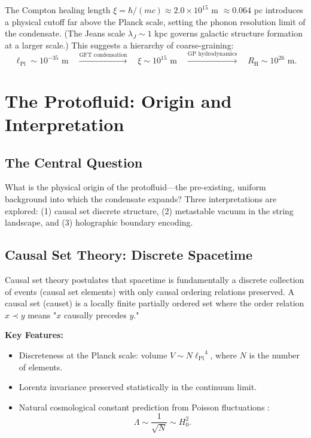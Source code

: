 \documentclass[11pt,a4paper]{article}
\newcommand{\lPl}{\ensuremath{\ell_{\mathrm{Pl}}}}
\newcommand{\RH}{\ensuremath{R_{\mathrm{H}}}}
\theoremstyle{definition}
\theoremstyle{remark}
\begin{document}
The Compton healing length $\xi = \hbar/(mc) \approx 2.0 \times 10^{15}$ m $\approx 0.064$ pc introduces a physical cutoff far above the Planck scale, setting the phonon resolution limit of the condensate. (The Jeans scale $\lambda_J \sim 1$ kpc governs galactic structure formation at a larger scale.) This suggests a hierarchy of coarse-graining:
\begin{equation}
\lPl \sim 10^{-35} \text{ m} \quad \xrightarrow{\text{GFT condensation}} \quad \xi \sim 10^{15} \text{ m} \quad \xrightarrow{\text{GP hydrodynamics}} \quad \RH \sim 10^{26} \text{ m}.
\end{equation}

\section{The Protofluid: Origin and Interpretation}
\label{sec:protofluid_origin}

\subsection{The Central Question}
\label{sec:protofluid_question}

What is the physical origin of the protofluid---the pre-existing, uniform background into which the condensate expands? Three interpretations are explored: (1) causal set discrete structure, (2) metastable vacuum in the string landscape, and (3) holographic boundary encoding.

\subsection{Causal Set Theory: Discrete Spacetime}
\label{sec:causet}

Causal set theory \cite{Sorkin2003,Surya2019} postulates that spacetime is fundamentally a discrete collection of events (causal set elements) with only causal ordering relations preserved. A causal set (causet) is a locally finite partially ordered set where the order relation $x \prec y$ means "$x$ causally precedes $y$."

\textbf{Key Features:}
\begin{itemize}
\item Discreteness at the Planck scale: volume $V \sim N \lPl^4$, where $N$ is the number of elements.
\item Lorentz invariance preserved statistically in the continuum limit.
\item Natural cosmological constant prediction from Poisson fluctuations \cite{Sorkin2007}:
\begin{equation}
\Lambda \sim \frac{1}{\sqrt{N}} \sim H_0^2.
\end{equation}
\end{itemize}
\end{document}
